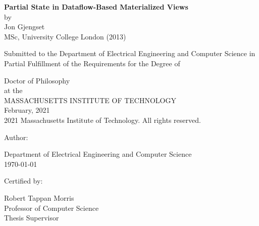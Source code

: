 \documentclass[fontsize=12pt,paper=letter]{scrartcl}
\begin{document}
\begin{titlepage}
  \begin{center}
    \textbf{\large Partial State in Dataflow-Based Materialized Views}\\
    \vspace{0.5\baselineskip}
    by\\
    \vspace{0.5\baselineskip}
    {\large Jon Gjengset}\\
    \vspace{0.5\baselineskip}
    MSc, University College London (2013)\\
    \vspace{0.5\baselineskip}
    \begin{addmargin}[0.1in]{0.1in}
      \centering
      Submitted to the Department of
      Electrical Engineering and Computer Science
      in Partial Fulfillment of the Requirements for the Degree of\\
    \end{addmargin}
    \vspace{0.5\baselineskip}
    Doctor of Philosophy\\
    \vspace{0.5\baselineskip}
    at the\\
    \vspace{0.5\baselineskip}
    MASSACHUSETTS INSTITUTE OF TECHNOLOGY\\
    \vspace{0.5\baselineskip}
    February, 2021\\
    \vspace{0.5\baselineskip}
    \textcopyright{} 2021 Massachusetts Institute of Technology.
    All rights reserved.
  \end{center}

  \vspace{2\baselineskip}
  {
  \raggedright
  Author: \dotfill

  \raggedleft
  Department of Electrical Engineering and Computer Science\\
  \today{}\\
  }

  \vspace{\baselineskip}
  {
  \raggedright
  Certified by: \dotfill

  \raggedleft
  Robert Tappan Morris\\
  Professor of Computer Science\\
  Thesis Supervisor\\
  }


\end{titlepage}
\end{document}
